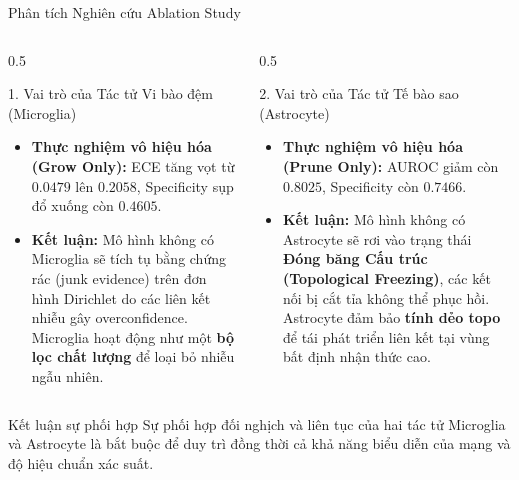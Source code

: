 \documentclass[aspectratio=169, 10pt]{beamer}
\begin{document}
\begin{frame}{Phân tích Nghiên cứu Ablation Study}
  \begin{columns}
    \begin{column}{0.5\textwidth}
      \begin{block}{1. Vai trò của Tác tử Vi bào đệm (Microglia)}
        \begin{itemize}
          \item \textbf{Thực nghiệm vô hiệu hóa (Grow Only):} ECE tăng vọt từ $0.0479$ lên \textbf{$0.2058$}, Specificity sụp đổ xuống còn \textbf{$0.4605$}.
          \item \textbf{Kết luận:} Mô hình không có Microglia sẽ tích tụ bằng chứng rác (junk evidence) trên đơn hình Dirichlet do các liên kết nhiễu gây overconfidence. Microglia hoạt động như một \textbf{bộ lọc chất lượng} để loại bỏ nhiễu ngẫu nhiên.
        \end{itemize}
      \end{block}
    \end{column}
    \begin{column}{0.5\textwidth}
      \begin{block}{2. Vai trò của Tác tử Tế bào sao (Astrocyte)}
        \begin{itemize}
          \item \textbf{Thực nghiệm vô hiệu hóa (Prune Only):} AUROC giảm còn \textbf{$0.8025$}, Specificity còn \textbf{$0.7466$}.
          \item \textbf{Kết luận:} Mô hình không có Astrocyte sẽ rơi vào trạng thái \textbf{Đóng băng Cấu trúc (Topological Freezing)}, các kết nối bị cắt tỉa không thể phục hồi. Astrocyte đảm bảo \textbf{tính dẻo topo} để tái phát triển liên kết tại vùng bất định nhận thức cao.
        \end{itemize}
      \end{block}
    \end{column}
  \end{columns}
  \begin{alertblock}{Kết luận sự phối hợp}
    Sự phối hợp đối nghịch và liên tục của hai tác tử Microglia và Astrocyte là bắt buộc để duy trì đồng thời cả khả năng biểu diễn của mạng và độ hiệu chuẩn xác suất.
  \end{alertblock}
\end{frame}
\end{document}
